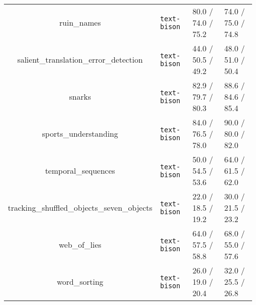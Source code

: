 \begin{table}[H]
\begin{center}
\begin{tabular}{cP{1.2cm}P{2.2cm}P{2.2cm}}
ruin\_names & \texttt{text-bison} & 80.0 / 74.0 / 75.2 & 74.0 / 75.0 / 74.8\\
salient\_translation\_error\_detection & \texttt{text-bison} & 44.0 / 50.5 / 49.2 & 48.0 / 51.0 / 50.4\\
snarks & \texttt{text-bison} & 82.9 / 79.7 / 80.3 & 88.6 / 84.6 / 85.4 \\
sports\_understanding & \texttt{text-bison} & 84.0 / 76.5 / 78.0 & 90.0 / 80.0 / 82.0 \\
temporal\_sequences & \texttt{text-bison} & 50.0 / 54.5 / 53.6 & 64.0 / 61.5 / 62.0\\
tracking\_shuffled\_objects\_seven\_objects & \texttt{text-bison} & 22.0 / 18.5 / 19.2 & 30.0 / 21.5 / 23.2 \\
web\_of\_lies & \texttt{text-bison} & 64.0 / 57.5 / 58.8 & 68.0 / 55.0 / 57.6\\
word\_sorting & \texttt{text-bison} & 26.0 / 19.0 / 20.4 & 32.0 / 25.5 / 26.8 \\
\bottomrule
\end{tabular}
\end{center}
\label{table:gpt_scores_on_bbh_tasks_starting_from_empty}
\end{table}

